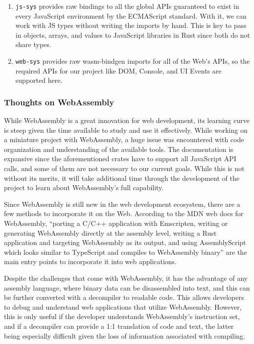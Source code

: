 \documentclass[
    paper=letter,
    parskip=half,
    fontsize=12pt,
    titlepage=firstiscover,
    toc=bibliography,
    numbers=endperiod
]{scrartcl}
\providecommand{\tightlist}{%
  \setlength{\itemsep}{0pt}\setlength{\parskip}{0pt}}
\begin{document}
\begin{enumerate}
    \tightlist
    \item \texttt{js-sys} \cite{js-sys} provides raw bindings to all the global APIs guaranteed to
          exist in every JavaScript environment by the ECMAScript standard. With
          it, we can work with JS types without writing the imports by hand. This is key to pass in objects,
          arrays, and values to JavaScript libraries in Rust since both do not share types.
    \item \texttt{web-sys} \cite{web-sys} provides raw wasm-bindgen imports for all of the Web's
          APIs, so the required APIs for our project like DOM, Console, and UI
          Events are supported here.
\end{enumerate}

\subsubsection{Thoughts on WebAssembly}

While WebAssembly is a great innovation for web development, its
learning curve is steep given the time available to study and use it
effectively. While working on a miniature project with WebAssembly, a
huge issue was encountered with code organization and understanding of
the available tools. The documentation is expansive since the
aforementioned crates have to support all JavaScript API calls, and some
of them are not necessary to our current goals. While this is not
without its merits, it will take additional time through the development
of the project to learn about WebAssembly's full capability.

Since WebAssembly is still new in the web development ecosystem, there
are a few methods to incorporate it on the Web. According to the MDN web
docs for WebAssembly, ``porting a C/C++ application with Emscripten,
writing or generating WebAssembly directly at the assembly level,
writing a Rust application and targeting WebAssembly as its output, and
using AssemblyScript which looks similar to TypeScript and compiles to
WebAssembly binary'' \cite{mozilla-webassembly-concepts} are the main
entry points to incorporate it into web applications.

Despite the challenges that come with WebAssembly, it has the advantage
of any assembly language, where binary data can be disassembled into
text, and this can be further converted with a decompiler to readable
code. This allows developers to debug and understand web applications
that utilize WebAssembly. However, this is only useful if the developer
understands WebAssembly's instruction set, and if a decompiler can
provide a 1:1 translation of code and text, the latter being especially
difficult given the loss of information associated with compiling.
\end{document}
